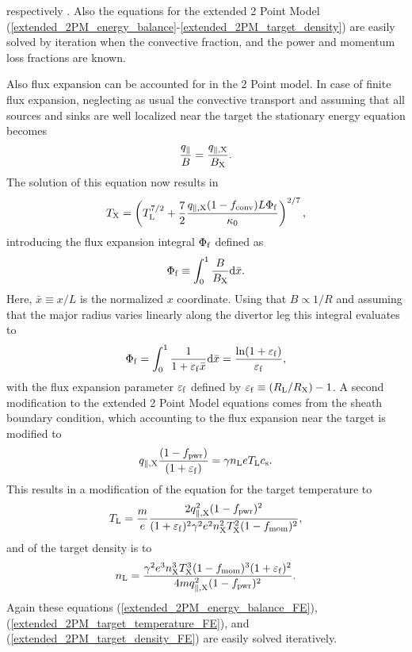 \documentclass[amsmath,amssymb,a4]{revtex4-2}
\begin{document}
respectively \cite{stangeby2018}. Also the equations for the extended 2 Point Model (\ref{extended_2PM_energy_balance}-\ref{extended_2PM_target_density}) are easily solved by iteration when the convective fraction, and the power and momentum loss fractions are known.

Also flux expansion can be accounted for in the 2 Point model. In case of finite flux expansion, neglecting as usual the convective transport and assuming that all sources and sinks are well localized near the target the stationary energy equation becomes
\begin{equation}
    {q_\parallel \over B} = {q_{\parallel, \rm X} \over B_{\rm X}}.
\end{equation}
The solution of this equation now results in
\begin{equation}\label{extended_2PM_energy_balance_FE}
    T_{\rm X} = \left(T_{\rm L}^{7/2} + {7 \over 2} {q_{\parallel,\rm X} (1 - f_{\rm conv}) L  \Phi_{\rm f} \over \kappa_0}\right)^{2/7},
\end{equation}
introducing the flux expansion integral $\Phi_{\rm f}$ defined as
\begin{equation}\label{FE_integral}
    \Phi_{\rm f} \equiv \int_0^1 {B\over B_{\rm X}} {\rm d}{\bar x}.
\end{equation}
Here, ${\bar x} \equiv x /L$ is the normalized $x$ coordinate. Using that $B \propto 1/R$ and assuming that the major radius varies linearly along the divertor leg this integral evaluates to
\begin{equation}\label{FE_integral_}
    \Phi_{\rm f} = \int_0^1 {1 \over 1 + \varepsilon_{\rm f} {\bar x}} {\rm d}{\bar x} = {\ln( 1 + \varepsilon_{\rm f} ) \over \varepsilon_{\rm f}},
\end{equation}
with the flux expansion parameter $\varepsilon_{\rm f}$ defined by $\varepsilon_{\rm f} \equiv (R_{\rm L}/R_{\rm X}) - 1$. A second modification to the extended 2 Point Model equations comes from the sheath boundary condition, which accounting to the flux expansion near the target is modified to
\begin{equation}\label{2PM_sheath_heat_transmission_FE}
    q_{\parallel,\rm X} {(1-f_{\rm pwr}) \over (1 + \varepsilon_{\rm f})} = \gamma n_{\rm L} e T_{\rm L} c_{\rm s}.
\end{equation}
This results in a modification of the equation for the target temperature to
\begin{equation}\label{extended_2PM_target_temperature_FE}
    T_{\rm L} = {m \over e} {2 q_{\parallel,\rm X}^2 (1-f_{\rm pwr})^2 \over (1 + \varepsilon_{\rm f})^2 \gamma^2 e^2 n_{\rm X}^2 T_{\rm X}^2 (1-f_{\rm mom})^2},
\end{equation}
and of the target density is to
\begin{equation}\label{extended_2PM_target_density_FE}
    n_{\rm L} = {\gamma^2 e^3 n_{\rm X}^3 T_{\rm X}^3 (1-f_{\rm mom})^3 (1 + \varepsilon_{\rm f})^2 \over 4 m q_{\parallel,\rm X}^2 (1-f_{\rm pwr})^2}.
\end{equation}
Again these equations (\ref{extended_2PM_energy_balance_FE}), (\ref{extended_2PM_target_temperature_FE}), and (\ref{extended_2PM_target_density_FE}) are easily solved iteratively.
\end{document}
